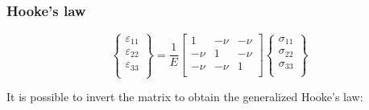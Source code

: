\documentclass[notes]{beamer}
\begin{document}
\begin{frame}
\begin{minipage}[t]{0.1\linewidth}
\begin{figure}
	\end{figure}
\end{minipage}	
\end{frame}

\begin{frame}
\frametitle{Hooke's law}

\begin{equation*}
	\begin{Bmatrix}
		\varepsilon_{11}\\
		\varepsilon_{22}\\
		\varepsilon_{33}\\
	\end{Bmatrix} = \frac{1}{E}
	\begin{bmatrix}
		1 & -\nu & -\nu \\
		-\nu & 1 & -\nu \\
		-\nu & -\nu & 1 \\
	\end{bmatrix}
	\begin{Bmatrix}
		\sigma_{11}\\
		\sigma_{22}\\
		\sigma_{33}\\
	\end{Bmatrix}
\end{equation*}

It is possible to invert the matrix to obtain the generalized Hooke's law: 


\end{frame}
\end{document}
